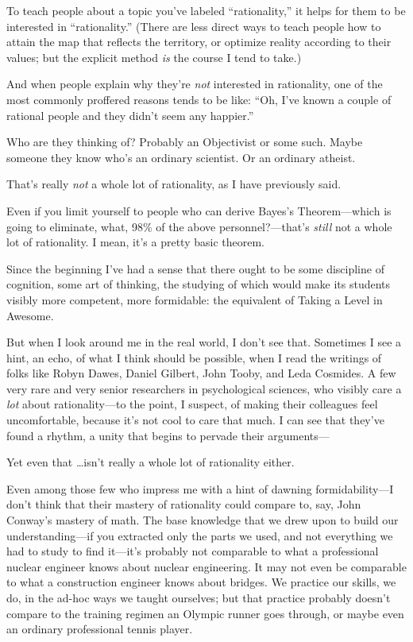 
{
 To teach people about a topic you've labeled
``rationality,'' it helps for them
to be interested in ``rationality.''
(There are less direct ways to teach people how to attain the map that
reflects the territory, or optimize reality according to their values;
but the explicit method \textit{is} the course I tend to take.) }

{
 And when people explain why they're \textit{not}
interested in rationality, one of the most commonly proffered reasons
tends to be like: ``Oh, I've known a
couple of rational people and they didn't seem any
happier.''}

{
 Who are they thinking of? Probably an Objectivist or some such.
Maybe someone they know who's an ordinary scientist. Or
an ordinary atheist.}

{
 That's really \textit{not} a whole lot of
rationality, as I have previously said.}

{
 Even if you limit yourself to people who can derive
Bayes's Theorem---which is going to eliminate, what,
98\% of the above personnel?---that's \textit{still}
not a whole lot of rationality. I mean, it's a pretty
basic theorem.}

{
 Since the beginning I've had a sense that there
ought to be some discipline of cognition, some art of thinking, the
studying of which would make its students visibly more competent, more
formidable: the equivalent of Taking a Level in Awesome.}

{
 But when I look around me in the real world, I
don't see that. Sometimes I see a hint, an echo, of
what I think should be possible, when I read the writings of folks like
Robyn Dawes, Daniel Gilbert, John Tooby, and Leda Cosmides. A few very
rare and very senior researchers in psychological sciences, who visibly
care a \textit{lot} about rationality---to the point, I suspect, of
making their colleagues feel uncomfortable, because
it's not cool to care that much. I can see that
they've found a rhythm, a unity that begins to pervade
their arguments---}

{
 Yet even that \ldots isn't really a whole lot of
rationality either.}

{
 Even among those few who impress me with a hint of dawning
formidability---I don't think that their mastery of
rationality could compare to, say, John Conway's
mastery of math. The base knowledge that we drew upon to build our
understanding---if you extracted only the parts we used, and not
everything we had to study to find it---it's probably
not comparable to what a professional nuclear engineer knows about
nuclear engineering. It may not even be comparable to what a
construction engineer knows about bridges. We practice our skills, we
do, in the ad-hoc ways we taught ourselves; but that practice probably
doesn't compare to the training regimen an Olympic
runner goes through, or maybe even an ordinary professional tennis
player.}

